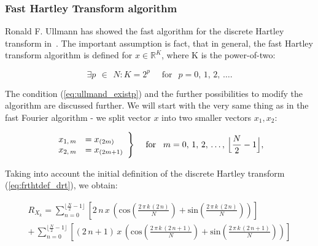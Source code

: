 \documentclass[12pt,twoside,a4paper]{article}
\numberwithin{equation}{subsection}
\numberwithin{figure}{subsection}
\begin{document}
\subsubsection*{Fast Hartley Transform algorithm}

Ronald F. Ullmann has showed the fast algorithm for the discrete Hartley transform in~\cite{ullmann_algorithm}. The important assumption is fact, that in general, the fast Hartley transform algorithm is defined for $x \in \mathbb{R} ^ K$, where K is the power-of-two:

\begin{equation} \label{eq:ullmand_existp}
  \exists p \, \ \in \ \, N : K = 2 ^ {p} \quad \mbox{ for } \ \, p = 0, \, 1, \, 2, \, \ldots  .
\end{equation}

The condition (\ref{eq:ullmand_existp}) and the further possibilities to modify the algorithm are discussed further. We will start with the very same thing as in the fast Fourier algorithm - we split vector $x$ into two smaller vectors $x_1, x_2$:

\begin{subequations} \label{eq:hartley_smallervectors}
	\begin{equation}   \label{eq:hsvs_oddeven}
		\begin{array}{c l}      
			x_{1, \, m} &= x_{(2m)} \\
			x_{2, \, m} &= x_{(2m+1)} 
		\end{array}\Bigg\} 
		\quad \mbox{ for } \ \, m = 0, \, 1, \, 2, \, \ldots, \, \Big\lfloor \frac{N}{2} - 1 \Big\rfloor , \\
  \end{equation}
\end{subequations}

Taking into account the initial definition of the discrete Hartley transform (\ref{eq:frthtdef_drt}), we obtain:

\begin{multline}  \label{eq:hartley_longdht}
	R_{X_k} =  
 			\sum_{n = 0}^{\lfloor \frac{N}{2} - 1 \rfloor } \left[ 2 \, n  \, x \,  \left(
 				\mathrm{cos} \left( \frac {2 \, \pi \, k \, (2 \, n) }{N} \right) 
  	  	  	  + \mathrm{sin} \left( \frac {2 \, \pi \, k \, (2 \, n) }{N} \right) \right) \right]
\\ + \, \sum_{n = 0}^{\lfloor \frac{N}{2} - 1 \rfloor } \left[ (2 \, n + 1) \, x \,  \left(
 				\mathrm{cos} \left( \frac {2 \, \pi \, k \, (2 \, n + 1)}{N} \right) 
 	  	      + \mathrm{sin} \left( \frac {2 \, \pi \, k \, (2 \, n + 1)}{N} \right) \right) \right]
\end{multline}
\end{document}
